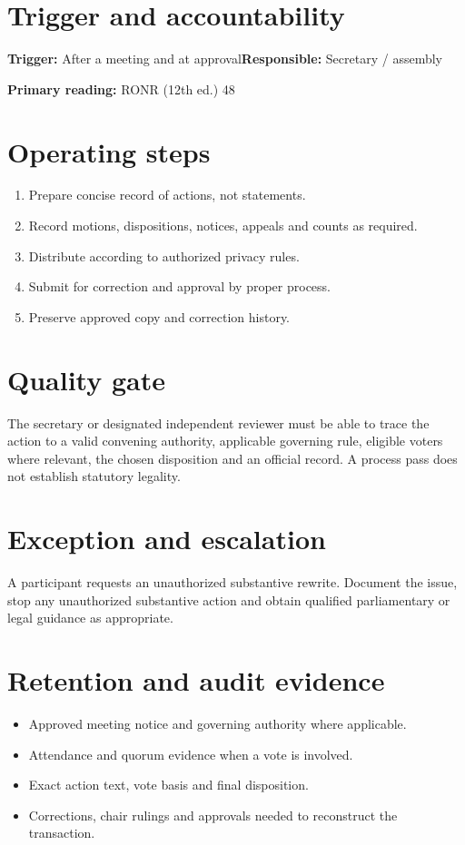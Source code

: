 \documentclass[11pt]{article}
\begin{document}
\SuiteOpen
{}
\section{Trigger and accountability}
\textbf{Trigger:} After a meeting and at approval\quad\textbf{Responsible:} Secretary / assembly

\textbf{Primary reading:} RONR (12th ed.) 48

\section{Operating steps}
\begin{enumerate}[leftmargin=*,itemsep=4pt]
\item Prepare concise record of actions, not statements.
\item Record motions, dispositions, notices, appeals and counts as required.
\item Distribute according to authorized privacy rules.
\item Submit for correction and approval by proper process.
\item Preserve approved copy and correction history.
\end{enumerate}

\section{Quality gate}
The secretary or designated independent reviewer must be able to trace the action to a valid convening authority, applicable governing rule, eligible voters where relevant, the chosen disposition and an official record. A process pass does not establish statutory legality.

\section{Exception and escalation}
A participant requests an unauthorized substantive rewrite. Document the issue, stop any unauthorized substantive action and obtain qualified parliamentary or legal guidance as appropriate.

\section{Retention and audit evidence}
\begin{itemize}[leftmargin=*,itemsep=4pt]
\item Approved meeting notice and governing authority where applicable.
\item Attendance and quorum evidence when a vote is involved.
\item Exact action text, vote basis and final disposition.
\item Corrections, chair rulings and approvals needed to reconstruct the transaction.
\end{itemize}
\end{document}
